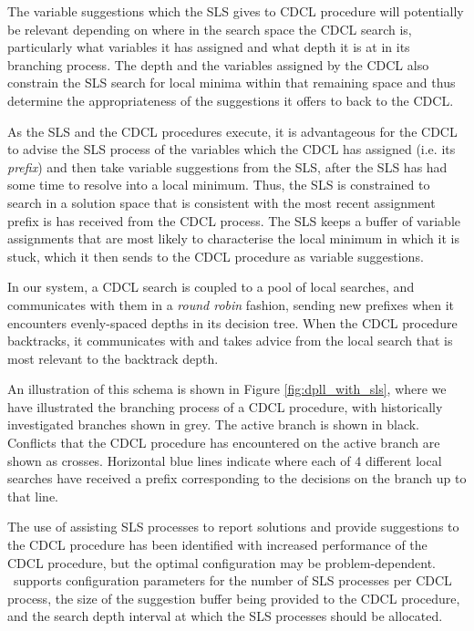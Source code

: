 \documentclass[
10pt, %
a4paper, %
oneside, %
headinclude,footinclude, %
BCOR5mm, %
]{scrartcl}
\begin{document}
The variable suggestions which the SLS gives to CDCL procedure will potentially be relevant depending on where in the search space the CDCL search is, particularly what variables it has assigned and what depth it is at in its branching process.
The depth and the variables assigned by the CDCL also constrain the SLS search for local minima within that remaining space and thus determine the appropriateness of the suggestions it offers to back to the CDCL.

As the SLS and the CDCL procedures execute, it is advantageous for the CDCL to advise the SLS process of the variables which the CDCL has assigned (i.e. its {\em prefix}) and then take variable suggestions from the SLS, after the SLS has had some time to resolve into a local minimum.
Thus, the SLS is constrained to search in a solution space that is consistent with the most recent assignment prefix is has received from the CDCL process. 
The SLS keeps a buffer of variable assignments that are most likely to characterise the local minimum in which it is stuck, which it then sends to the CDCL procedure as variable suggestions.

In our \dagster system, a CDCL search is coupled to a pool of local searches, and communicates with them in a {\em round robin} fashion, sending new prefixes when it encounters evenly-spaced depths in its decision tree.
When the CDCL procedure backtracks, it communicates with and takes advice from the local search that is most relevant to the backtrack depth.

An illustration of this schema is shown in Figure \ref{fig:dpll_with_sls}, where we have illustrated the branching process of a CDCL procedure, with historically investigated branches shown in grey.
The active branch is shown in black.
Conflicts that the CDCL procedure has encountered on the active branch are shown as crosses.
Horizontal blue lines indicate where each of 4 different local searches have received a prefix corresponding to the decisions on the branch up to that line.

The use of assisting SLS processes to report solutions and provide suggestions to the CDCL procedure has been identified with increased performance of the CDCL procedure, but the optimal configuration may be problem-dependent.
\dagster\  supports configuration parameters for the number of SLS processes per CDCL process, the size of the suggestion buffer being provided to the CDCL procedure, and the search depth interval at which the SLS processes should be allocated.
 
\end{document}
